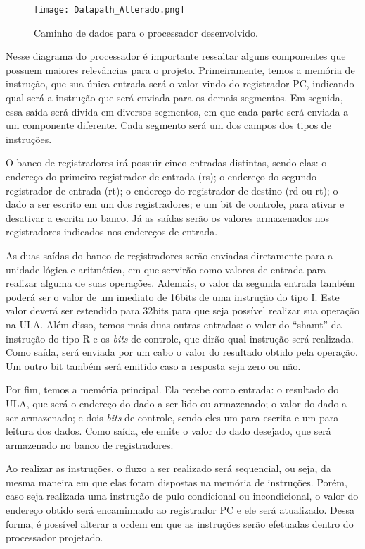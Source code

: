 \documentclass[
	12pt,				%
	oneside,
	a4paper,			%
	english,			%
	french,				%
	spanish,			%
	brazil,				%
	]{abntex2}
\begin{document}
\begin{figure}[ht]
\centering 
\caption{Caminho de dados para o processador desenvolvido.} \label{fig:Datapath_Alterado}
\graphicspath{ {./Imagens/} } 
\texttt{[image: Datapath\_Alterado.png]}
\end{figure}

Nesse diagrama do processador é importante ressaltar alguns componentes que possuem maiores relevâncias para o projeto. Primeiramente, temos a memória de instrução, que sua única entrada será o valor vindo do registrador PC, indicando qual será a instrução que será enviada para os demais segmentos. Em seguida, essa saída será divida em diversos segmentos, em que cada parte será enviada a um componente diferente. Cada segmento será um dos campos dos tipos de instruções. 

O banco de registradores irá possuir cinco entradas distintas, sendo elas: o endereço do primeiro registrador de entrada (rs); o endereço do segundo registrador de entrada (rt); o endereço do registrador de destino (rd ou rt); o dado a ser escrito em um dos registradores; e um bit de controle, para ativar e desativar a escrita no banco. Já as saídas serão os valores armazenados nos registradores indicados nos endereços de entrada.

As duas saídas do banco de registradores serão enviadas diretamente para a unidade lógica e aritmética, em que servirão como valores de entrada para realizar alguma de suas operações. Ademais, o valor da segunda entrada também poderá ser o valor de um imediato de 16bits de uma instrução do tipo I. Este valor deverá ser estendido para 32bits para que seja possível realizar sua operação na ULA. Além disso, temos mais duas outras entradas: o valor do ``shamt'' da instrução do tipo R e os \emph{bits} de controle, que dirão qual instrução será realizada. Como saída, será enviada por um cabo o valor do resultado obtido pela operação. Um outro bit também será emitido caso a resposta seja zero ou não.

Por fim, temos a memória principal. Ela recebe como entrada: o resultado do ULA, que será o endereço do dado a ser lido ou armazenado; o valor do dado a ser armazenado; e dois \emph{bits} de controle, sendo eles um para escrita e um para leitura dos dados. Como saída, ele emite o valor do dado desejado, que será armazenado no banco de registradores.

Ao realizar as instruções, o fluxo a ser realizado será sequencial, ou seja, da mesma maneira em que elas foram dispostas na memória de instruções. Porém, caso seja realizada uma instrução de pulo condicional ou incondicional, o valor do endereço obtido será encaminhado ao registrador PC e ele será atualizado. Dessa forma, é possível alterar a ordem em que as instruções serão efetuadas dentro do processador projetado. 
\end{document}
